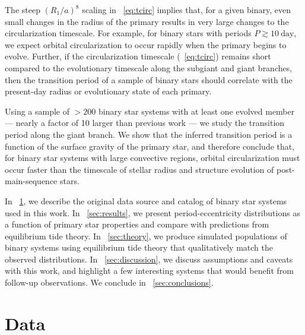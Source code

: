 \documentclass[modern, letterpaper]{aastex62}
\begin{document}
The steep $\left(R_1 / a\right)^8$ scaling in \eqname~\ref{eq:tcirc}
implies that, for a given binary, even small changes in the radius of the
primary results in very large changes to the circularization timescale.
For example, for binary stars with periods $P \gtrsim 10~\textrm{day}$, we
expect orbital circularization to occur rapidly when the primary begins to
evolve.
Further, if the circularization timescale (\eqname~\ref{eq:tcirc}) remains short
compared to the evolutionary timescale along the subgiant and giant branches,
then the transition period of a sample of binary stars should
correlate with the present-day radius or evolutionary state of each primary.

Using a sample of $>200$ binary star systems with at least one evolved member --- nearly a factor of 10 larger than previous work --- we study the transition period along the giant branch.
We show that the inferred transition period is a function of the surface gravity of the primary star, and therefore conclude that, for binary star systems with large convective regions, orbital circularization must occur faster than the timescale of stellar radius and structure evolution of post-main-sequence stars.

In \sectionname~\ref{sec:data}, we describe the original data source and catalog of binary star systems used in this work.
In \sectionname~\ref{sec:results}, we present period-eccentricity distributions as a function of primary star properties and compare with predictions from equilibrium tide theory.
In \sectionname~\ref{sec:theory}, we produce simulated populations of binary systems using equilibrium tide theory that qualitatively match the observed distributions.
In \sectionname~\ref{sec:discussion}, we discuss assumptions and caveats with this work, and highlight a few interesting systems that would benefit from follow-up observations.
We conclude in \sectionname~\ref{sec:conclusions}.


\section{Data} \label{sec:data}
\end{document}
